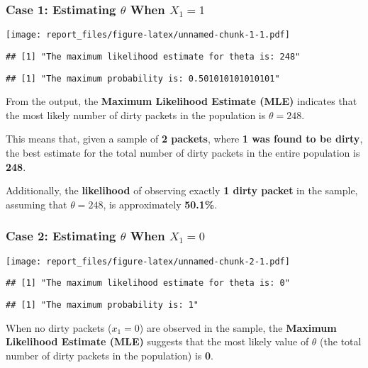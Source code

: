 \documentclass[
  14pt,
]{article}
\begin{document}
\subsubsection{\texorpdfstring{\textbf{Case 1: Estimating} \(\theta\)
When
\(X_1 = 1\)}{Case 1: Estimating \textbackslash theta When X\_1 = 1}}\label{case-1-estimating-theta-when-x_1-1}

\texttt{[image: report\_files/figure-latex/unnamed-chunk-1-1.pdf]}

\begin{verbatim}
## [1] "The maximum likelihood estimate for theta is: 248"
\end{verbatim}

\begin{verbatim}
## [1] "The maximum probability is: 0.501010101010101"
\end{verbatim}

From the output, the \textbf{Maximum Likelihood Estimate (MLE)}
indicates that the most likely number of dirty packets in the population
is \(\theta = 248\).

This means that, given a sample of \textbf{2 packets}, where \textbf{1
was found to be dirty}, the best estimate for the total number of dirty
packets in the entire population is \textbf{248}.

Additionally, the \textbf{likelihood} of observing exactly \textbf{1
dirty packet} in the sample, assuming that \(\theta = 248\), is
approximately \textbf{50.1\%}.

\subsubsection{\texorpdfstring{Case 2: Estimating \(\theta\) When
\(X_1 = 0\)}{Case 2: Estimating \textbackslash theta When X\_1 = 0}}\label{case-2-estimating-theta-when-x_1-0}

\texttt{[image: report\_files/figure-latex/unnamed-chunk-2-1.pdf]}

\begin{verbatim}
## [1] "The maximum likelihood estimate for theta is: 0"
\end{verbatim}

\begin{verbatim}
## [1] "The maximum probability is: 1"
\end{verbatim}

\hfill\break

When no dirty packets (\(x_1 = 0\)) are observed in the sample, the
\textbf{Maximum Likelihood Estimate (MLE)} suggests that the most likely
value of \(\theta\) (the total number of dirty packets in the
population) is \textbf{0}.
\end{document}
